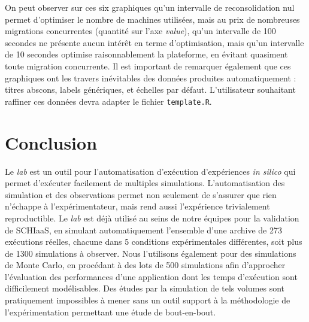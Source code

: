 \documentclass[parallelisme]{compas2017}
\begin{document}
On peut observer  sur ces six graphiques qu'un intervalle de reconsolidation nul
permet d'optimiser le  nombre de machines utilisées, mais au  prix de nombreuses
migrations concurrentes (quantité sur l'axe \textit{value}), qu'un intervalle de
100  secondes ne  présente aucun  intérêt  en terme  d'optimisation, mais  qu'un
intervalle  de 10  secondes optimise  raisonnablement la  plateforme, en  évitant
quasiment toute migration  concurrente.  Il est important de remarquer également
que  ces   graphiques ont les travers inévitables
des   données  produites automatiquement : titres abscons, labels   génériques,
et   échelles  par défaut. L'utilisateur souhaitant raffiner ces données devra
adapter le fichier \texttt{template.R}.

\section{Conclusion} \label{sec:conclusion}

Le  \emph{lab}  est un  outil  pour  l'automatisation d'exécution  d'expériences
\emph{in  silico} qui  permet  d'exécuter facilement  de multiples  simulations.
L'automatisation  des simulation  et des  observations permet  non seulement  de
s'assurer que rien  n'échappe à l'expérimentateur, mais  rend aussi l'expérience
trivialement reproductible.   Le \emph{lab} est  déjà utilisé au seins  de notre
équipes pour  la validation de  SCHIaaS, en simulant  automatiquement l'ensemble
d'une   archive  de   273  exécutions   réelles,  chacune   dans  5   conditions
expérimentales  différentes, soit  plus de  1300 simulations  à observer.   Nous
l'utilisons également  pour des simulations de  Monte Carlo, en procédant  à des
lots de  500 simulations  afin d'approcher  l'évaluation des  performances d'une
application  dont les  temps d'exécution  sont difficilement  modélisables.  Des
études par la  simulation de tels volumes sont pratiquement  impossibles à mener
sans  un outil  support à  la méthodologie  de l'expérimentation  permettant une
étude de bout-en-bout.





\end{document}
